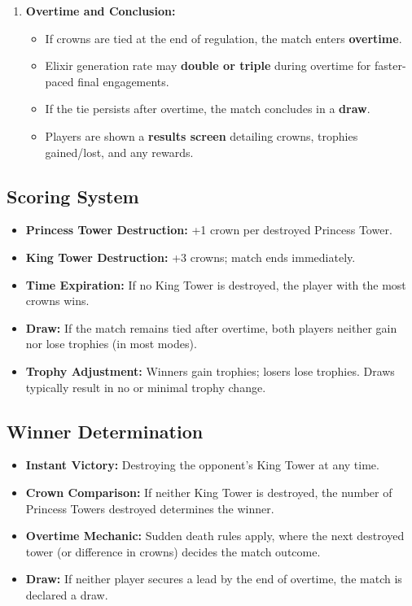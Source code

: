 \documentclass{article}
\begin{document}
\begin{enumerate}[label=\arabic*.]
    \item \textbf{Overtime and Conclusion:}
    \begin{itemize}
        \item If crowns are tied at the end of regulation, the match enters \textbf{overtime}.
        \item Elixir generation rate may \textbf{double or triple} during overtime for faster-paced final engagements.
        \item If the tie persists after overtime, the match concludes in a \textbf{draw}.
        \item Players are shown a \textbf{results screen} detailing crowns, trophies gained/lost, and any rewards.
    \end{itemize}
\end{enumerate}

\subsection{Scoring System}
\begin{itemize}
    \item \textbf{Princess Tower Destruction:} +1 crown per destroyed Princess Tower.
    \item \textbf{King Tower Destruction:} +3 crowns; match ends immediately.
    \item \textbf{Time Expiration:} If no King Tower is destroyed, the player with the most crowns wins.
    \item \textbf{Draw:} If the match remains tied after overtime, both players neither gain nor lose trophies (in most modes).
    \item \textbf{Trophy Adjustment:} Winners gain trophies; losers lose trophies. Draws typically result in no or minimal trophy change.
\end{itemize}

\subsection{Winner Determination}
\begin{itemize}
    \item \textbf{Instant Victory:} Destroying the opponent’s King Tower at any time.
    \item \textbf{Crown Comparison:} If neither King Tower is destroyed, the number of Princess Towers destroyed determines the winner.
    \item \textbf{Overtime Mechanic:} Sudden death rules apply, where the next destroyed tower (or difference in crowns) decides the match outcome.
    \item \textbf{Draw:} If neither player secures a lead by the end of overtime, the match is declared a draw.
\end{itemize}
\end{document}
